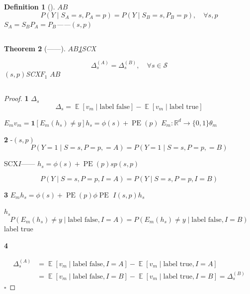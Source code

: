 \documentclass[11pt,a4paper]{article}
\DeclareMathOperator{\PE}{PE}
\newtheorem{theorem}{Theorem}[section]
\newtheorem{definition}[theorem]{Definition}
\theoremstyle{remark}
\DeclareMathOperator{\E}{\mathbb{E}}
\newcommand{\R}{\mathbb{R}}
\newcommand{\Sstates}{\mathcal{S}}
\begin{document}
\begin{definition}[]
\label{def:same_standard}
$A$$B$\textbf{}
\begin{equation}
    P(Y \mid S_A = s, P_A = p) = P(Y \mid S_B = s, P_B = p),
    \quad \forall s, p
\end{equation}
\textbf{}
$S_A = S_B$$P_A = P_B$——$(s, p)$
\end{definition}

\subsection{}

\begin{theorem}[——]
\label{thm:judicial_equality}
$A$$B$\ref{def:same_standard}SCX

\begin{equation}
    \boxed{\Delta_s^{(A)} = \Delta_s^{(B)}, \quad \forall s \in \Sstates}
\end{equation}
$(s, p)$SCX$F_1$
$A$$B$
\end{theorem}

\subsection{}

\begin{proof}
\textbf{1}
$\Delta_s$
\begin{equation}
    \Delta_s = \E[v_m \mid \text{label false}] - \E[v_m \mid \text{label true}]
\end{equation}

$E_m$$v_m = \mathbf{1}[E_m(h_s) \neq y]$$h_s = \phi(s) + \PE(p)$
$E_m: \R^d \to \{0,1\}$$\theta_m$

\textbf{2}
-$(s, p)$
\begin{equation}
    P(Y = 1 \mid S = s, P = p, \text{}=A)
    = P(Y = 1 \mid S = s, P = p, \text{}=B)
\end{equation}

SCX$I$——
$h_s = \phi(s) + \PE(p)$$s$$p$$(s, p)$

\begin{equation}
    P(Y \mid S=s, P=p, I=A) = P(Y \mid S=s, P=p, I=B)
\end{equation}

\textbf{3}
$E_m$$h_s = \phi(s) + \PE(p)$$\phi$$\PE$
$I$$(s, p)$$h_s$

$h_s$
\begin{equation}
    P(E_m(h_s) \neq y \mid \text{label false}, I=A)
    = P(E_m(h_s) \neq y \mid \text{label false}, I=B)
\end{equation}
label true

\textbf{4}

\begin{align}
    \Delta_s^{(A)}
    &= \E[v_m \mid \text{label false}, I=A]
       - \E[v_m \mid \text{label true}, I=A] \nonumber\\
    &= \E[v_m \mid \text{label false}, I=B]
       - \E[v_m \mid \text{label true}, I=B]
    = \Delta_s^{(B)}
\end{align}
\hfill $\square$
\end{proof}
\end{document}
